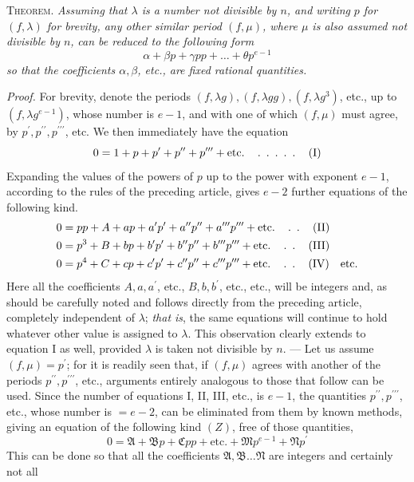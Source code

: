 \textsc{Theorem.} \textit{Assuming that \(\lambda\) is a number not divisible by \(n\), and writing} \textit{\(p\) for \((f,\allowbreak \lambda)\) for brevity, any other similar period \((f,\allowbreak \mu)\), where \(\mu\) is also assumed not divisible by \(n\),} \textit{can be reduced to the following form} \[\alpha+\beta p+\gamma pp+\ldots+\theta p^{e-1}\] \textit{so that the coefficients \(\alpha,\allowbreak \beta\), etc., are fixed rational quantities.}

\textit{Proof.} For brevity, denote the periods \((f,\allowbreak \lambda g),\allowbreak (f,\allowbreak \lambda gg),\allowbreak (f,\allowbreak \lambda g^3)\), etc., up to \((f,\allowbreak \lambda g^{e-1})\), whose number is \(e-1\), and with one of which \((f,\allowbreak \mu)\) must agree, by \(p^{\prime},\allowbreak p^{\prime\prime},\allowbreak p^{\prime\prime\prime}\), etc. We then immediately have the equation \[0=1+p+p^{\prime}+p^{\prime\prime}+p^{\prime\prime\prime}+\text{etc.}\quad\mathinner{\ldotp\ \ldotp\ \ldotp\ \ldotp\ \ldotp}\quad(\mathrm I)\] Expanding the values of the powers of \(p\) up to the power with exponent \(e-1\), according to the rules of the preceding article, gives \(e-2\) further equations of the following kind. \[\begin{aligned}0&=pp+A+ap+a^{\prime} p^{\prime}+a^{\prime\prime} p^{\prime\prime}+a^{\prime\prime\prime} p^{\prime\prime\prime}+\text{etc.}\quad\mathinner{\ldotp\ \ldotp}\quad(\mathrm{II})\\0&=p^3+B+bp+b^{\prime} p^{\prime}+b^{\prime\prime} p^{\prime\prime}+b^{\prime\prime\prime} p^{\prime\prime\prime}+\text{etc.}\quad\mathinner{\ldotp\ \ldotp}\quad(\mathrm{III})\\0&=p^4+C+cp+c^{\prime} p^{\prime}+c^{\prime\prime} p^{\prime\prime}+c^{\prime\prime\prime} p^{\prime\prime\prime}+\text{etc.}\quad\mathinner{\ldotp\ \ldotp}\quad(\mathrm{IV})\quad\text{etc.}\end{aligned}\] Here all the coefficients \(A,\allowbreak a,\allowbreak a^{\prime}\), etc., \(B,\allowbreak b,\allowbreak b^{\prime}\), etc., etc., will be integers and, as should be carefully noted and follows directly from the preceding article, completely independent of \(\lambda\); \textit{that is}, the same equations will continue to hold whatever other value is assigned to \(\lambda\). This observation clearly extends to equation I as well, provided \(\lambda\) is taken not divisible by \(n\). --- Let us assume \((f,\allowbreak \mu)=p^{\prime}\); for it is readily seen that, if \((f,\allowbreak \mu)\) agrees with another of the periods \(p^{\prime\prime},\allowbreak p^{\prime\prime\prime}\), etc., arguments entirely analogous to those that follow can be used. Since the number of equations I, II, III, etc., is \(e-1\), the quantities \(p^{\prime\prime},\allowbreak p^{\prime\prime\prime}\), etc., whose number is \(=e-2\), can be eliminated from them by known methods, giving an equation of the following kind \((Z)\), free of those quantities, \[0=\mathfrak A+\mathfrak Bp+\mathfrak Cpp+\text{etc.}+\mathfrak Mp^{e-1}+\mathfrak Np^{\prime}\] This can be done so that all the coefficients \(\mathfrak A,\allowbreak \mathfrak B\ldots\mathfrak N\) are integers and certainly not all 